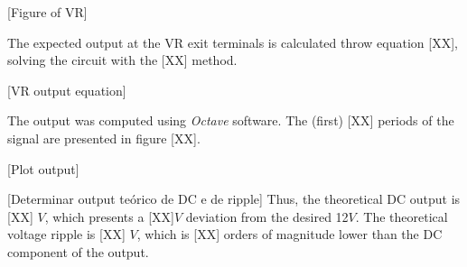 [Figure of VR]

The expected output at the VR exit terminals is calculated throw equation [XX], solving the circuit with the [XX] method.

[VR output equation]

The output was computed using \textit{Octave} software. The (first) [XX] periods of the signal are presented in figure [XX].

[Plot output]

[Determinar output teórico de DC e de ripple]
Thus, the theoretical DC output is [XX] $V$, which presents a [XX]$V$ deviation from the desired 12$V$. The theoretical voltage ripple is [XX] $V$, which is [XX] orders of magnitude lower than the DC component of the output.  


%




